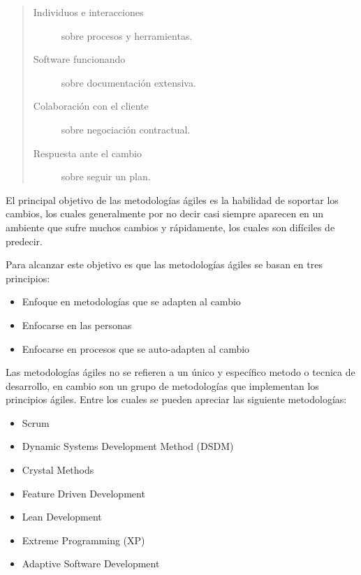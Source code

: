    \begin{quote}
     \begin{description}
       \item[Individuos e interacciones] sobre procesos y herramientas.
       \item[Software funcionando] sobre documentación extensiva.
       \item[Colaboración con el cliente] sobre negociación contractual.
       \item[Respuesta ante el cambio] sobre seguir un plan.
     \end{description}
   \end{quote}


   El principal objetivo de las metodologías ágiles es la habilidad de soportar los cambios, los cuales generalmente por no decir casi siempre aparecen en un ambiente que sufre muchos cambios y rápidamente, los cuales son difíciles de predecir.\cite{design2005}


   Para alcanzar este objetivo es que las metodologías ágiles se basan en tres principios: \cite{xpHutagalung}

\begin{itemize}
 \item Enfoque en metodologías que se adapten al cambio
 \item Enfocarse en las personas
 \item Enfocarse en procesos que se auto-adapten al cambio
\end{itemize}

   Las metodologías ágiles no se refieren a un único y específico metodo o tecnica de desarrollo, en cambio son un grupo de metodologías que implementan los principios ágiles. Entre los cuales se pueden apreciar las siguiente metodologías:

   \begin{itemize}
     \item Scrum
     \item Dynamic Systems Development Method (DSDM)
     \item Crystal Methods
     \item Feature Driven Development
     \item Lean Development
     \item Extreme Programming (XP)
     \item Adaptive Software Development
   \end{itemize}


